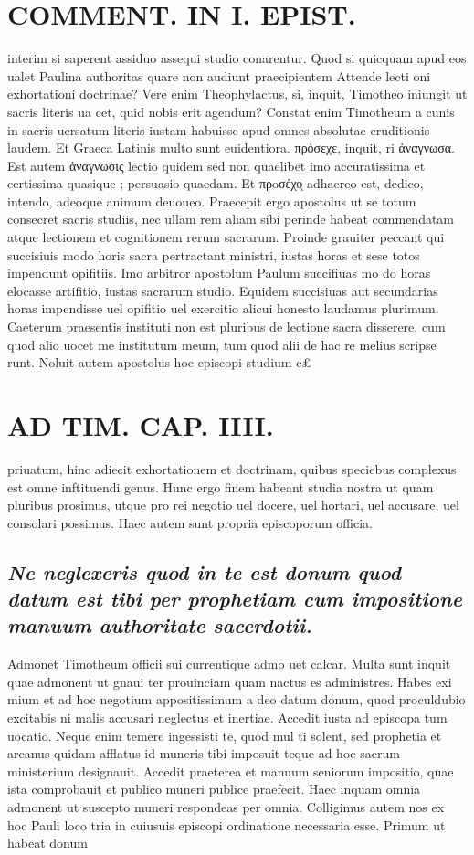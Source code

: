 \documentclass{article}
\begin{document}
\begin{pages}
\section*{COMMENT. IN I. EPIST. }\pstart interim si saperent assiduo assequi studio conarentur. Quod si quicquam apud eos ualet Paulina authoritas quare non audiunt praecipientem Attende lecti oni exhortationi doctrinae? Vere enim Theophylactus, si, inquit, Timotheo iniungit ut sacris literis ua cet, quid nobis erit agendum? Constat enim Timotheum a cunis in sacris uersatum literis iustam habuisse apud omnes absolutae eruditionis laudem. Et Graeca Latinis multo sunt euidentiora. πρόσεχε, inquit, ri ἀναγνωσα. Est autem ἀναγνωσις lectio quidem sed non quaelibet imo accuratissima et certissima quasique ; persuasio quaedam. Et πρoσέχοͅ adhaereo est, dedico, intendo, adeoque animum deuoueo. Praecepit ergo apostolus ut se totum consecret sacris studiis, nec ullam rem aliam sibi perinde habeat commendatam atque lectionem et cognitionem rerum sacrarum. Proinde grauiter peccant qui succisiuis modo horis sacra pertractant ministri, iustas horas et sese totos impendunt opifitiis. Imo arbitror apostolum Paulum succifiuas mo do horas elocasse artifitio, iustas sacrarum studio. Equidem succisiuas aut secundarias horas impendisse uel opifitio uel exercitio alicui honesto laudamus plurimum. Caeterum praesentis instituti non est pluribus de lectione sacra disserere, cum quod alio uocet me institutum meum, tum quod alii de hac re melius scripse runt. Noluit autem apostolus hoc episcopi studium e£  \pend
\section*{AD TIM. CAP. IIII. }
\marginpar{[ p.146 ]}\pstart priuatum, hinc adiecit exhortationem et doctrinam, quibus speciebus complexus est omne inftituendi genus. Hunc ergo finem habeant studia nostra ut quam pluribus prosimus, utque pro rei negotio uel docere, uel hortari, uel accusare, uel consolari possimus. Haec autem sunt propria episcoporum officia.  \pend
{}
{}
\subsection*{\textit{Ne neglexeris quod in te est donum quod datum est tibi per prophetiam cum impositione manuum authoritate sacerdotii. }}\pstart Admonet Timotheum officii sui currentique admo uet calcar. Multa sunt inquit quae admonent ut gnaui ter prouinciam quam nactus es administres. Habes exi mium et ad hoc negotium appositissimum a deo datum donum, quod proculdubio excitabis ni malis accusari neglectus et inertiae. Accedit iusta ad episcopa tum uocatio. Neque enim temere ingessisti te, quod mul ti solent, sed prophetia et arcanus quidam afflatus id muneris tibi imposuit teque ad hoc sacrum ministerium designauit. Accedit praeterea et manuum seniorum impositio, quae ista comprobauit et publico muneri publice praefecit. Haec inquam omnia admonent ut suscepto muneri respondeas per omnia. Colligimus autem nos ex hoc Pauli loco tria in cuiusuis episcopi ordinatione necessaria esse. Primum ut habeat donum  \pend

\end{pages}
\end{document}
